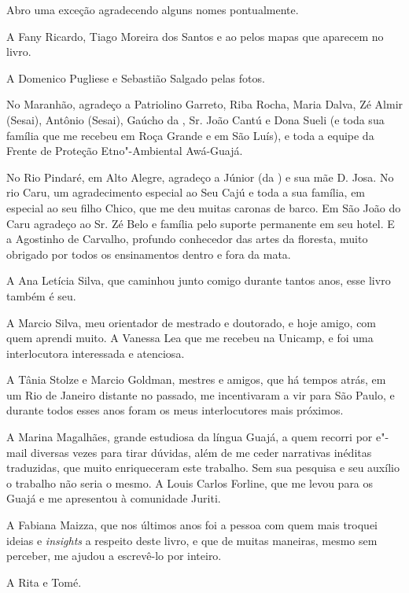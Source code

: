 Abro uma exceção agradecendo alguns nomes pontualmente.

A Fany Ricardo, Tiago Moreira dos Santos e ao  pelos mapas que
aparecem no livro.

A Domenico Pugliese e Sebastião Salgado pelas fotos.

No Maranhão, agradeço a Patriolino Garreto, Riba Rocha, Maria Dalva, Zé
Almir (Sesai), Antônio (Sesai), Gaúcho da , Sr. João Cantú e Dona
Sueli (e toda sua família que me recebeu em Roça Grande e em São Luís),
e toda a equipe da Frente de Proteção Etno"-Ambiental Awá-Guajá.

No Rio Pindaré, em Alto Alegre, agradeço a Júnior (da ) e sua mãe
D. Josa. No rio Caru, um agradecimento especial ao Seu Cajú e toda a sua
família, em especial ao seu filho Chico, que me deu muitas caronas de
barco. Em São João do Caru agradeço ao Sr. Zé Belo e família pelo
suporte permanente em seu hotel. E a Agostinho de Carvalho, profundo
conhecedor das artes da floresta, muito obrigado por todos os
ensinamentos dentro e fora da mata.

A Ana Letícia Silva, que caminhou junto comigo durante tantos anos, esse
livro também é seu.

A Marcio Silva, meu orientador de mestrado e doutorado, e hoje amigo,
com quem aprendi muito. A Vanessa Lea que me recebeu na Unicamp, e foi
uma interlocutora interessada e atenciosa.

A Tânia Stolze e Marcio Goldman, mestres e amigos, que há tempos atrás,
em um Rio de Janeiro distante no passado, me incentivaram a vir para São
Paulo, e durante todos esses anos foram os meus interlocutores mais
próximos.

A Marina Magalhães, grande estudiosa da língua Guajá, a quem recorri por
e"-mail diversas vezes para tirar dúvidas, além de me ceder narrativas
inéditas traduzidas, que muito enriqueceram este trabalho. Sem sua
pesquisa e seu auxílio o trabalho não seria o mesmo. A Louis Carlos
Forline, que me levou para os Guajá e me apresentou à comunidade Juriti.

A Fabiana Maizza, que nos últimos anos foi a pessoa com quem mais
troquei ideias e \emph{insights} a respeito deste livro, e que de muitas
maneiras, mesmo sem perceber, me ajudou a escrevê-lo por inteiro.

A Rita e Tomé.


